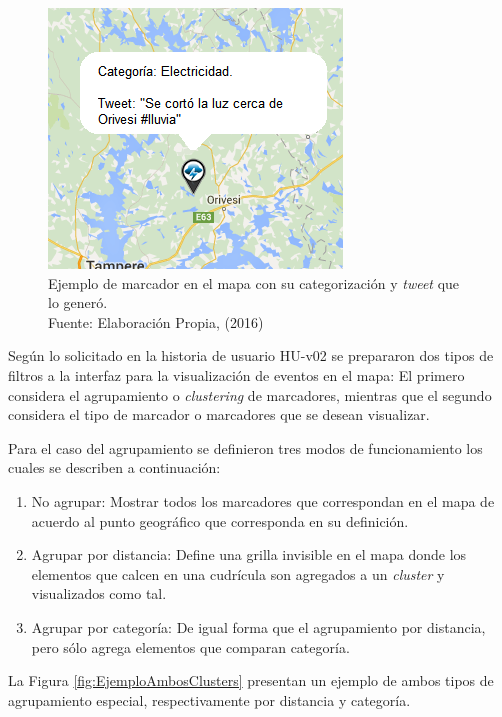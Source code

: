 \begin{figure}[H]
	\centering
	\captionsetup{justification=centering}
	\includegraphics[scale=0.8]{images/EjemploMarker.png}
	\caption[Ejemplo de marcador en el mapa con su categorización y \textit{tweet} que lo generó.]{Ejemplo de marcador en el mapa con su categorización y \textit{tweet} que lo generó.\\Fuente: Elaboración Propia, (2016)}
	\label{fig:EjemploMarker}
\end{figure}

Según lo solicitado en la historia de usuario HU-v02 se prepararon dos tipos de filtros a la interfaz para la visualización de eventos en el mapa: El primero considera el agrupamiento o \textit{clustering} de marcadores, mientras que el segundo considera el tipo de marcador o marcadores que se desean visualizar.

Para el caso del agrupamiento se definieron tres modos de funcionamiento los cuales se describen a continuación:

\begin{enumerate}
\item No agrupar: Mostrar todos los marcadores que correspondan en el mapa de acuerdo al punto geográfico que corresponda en su definición.
\item Agrupar por distancia: Define una grilla invisible en el mapa donde los elementos que calcen en una cudrícula son agregados a un \textit{cluster} y visualizados como tal.
\item Agrupar por categoría: De igual forma que el agrupamiento por distancia, pero sólo agrega elementos que comparan categoría.
\end{enumerate}

La Figura \ref{fig:EjemploAmbosClusters} presentan un ejemplo de ambos tipos de agrupamiento especial, respectivamente por distancia y categoría.

